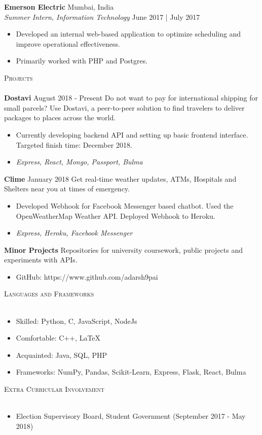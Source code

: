 \documentclass[a4paper]{article}
\newcommand{\lineunder} {
    \vspace*{-8pt} \\
    \hspace*{-18pt} \hrulefill \\
}
\newcommand{\header} [1] {
    {\hspace*{-18pt}\vspace*{6pt} \textsc{#1}}
    \vspace*{-6pt} \lineunder
}
\begin{document}
\textbf{Emerson Electric} \hfill Mumbai, India\\
\textit{Summer Intern, Information Technology} \hfill June 2017 | July 2017\\
\vspace{-1mm}
\begin{itemize} \itemsep 1pt
	\item Developed an internal web-based application to optimize scheduling and improve operational effectiveness.
	\item Primarily worked with PHP and Postgres.
\end{itemize}


\vspace{2mm}

\header{Projects}
{\textbf{Dostavi}} August 2018 - Present \hspace{1mm} Do not want to pay for international shipping for small parcels? Use Dostavi, a peer-to-peer solution to find travelers to deliver packages to places across the world. 
\begin{itemize}
\item Currently developing backend API and setting up basic frontend interface. Targeted finish time: December 2018.
\item \textit{Express, React, Mongo, Passport, Bulma} 
\end{itemize}
\vspace*{2mm}
{\textbf{Clime}} January 2018 \hspace{1mm} Get real-time weather updates, ATMs, Hospitals and Shelters near you at times of emergency.
\begin{itemize}
\item Developed Webhook for Facebook Messenger based chatbot. Used the OpenWeatherMap Weather API. Deployed Webhook to Heroku.
\item \textit{Express, Heroku, Facebook Messenger}
\end{itemize}
\textbf{Minor Projects} Repositories for university coursework, public projects and experiments with APIs. 
\begin{itemize}
\item GitHub: https://www.github.com/adarsh9pai
\end{itemize}
\vspace{2mm}

\header{Languages and Frameworks}
\begin{itemize}
\item Skilled: Python, C, JavaScript, NodeJs
\item Comfortable: C++, \LaTeX
\item Acquainted: Java, SQL, PHP
\item Frameworks: NumPy, Pandas, Scikit-Learn, Express, Flask, React, Bulma
\end{itemize}

\vspace{2mm}

\header{Extra Curricular Involvement}
\begin{itemize}
\item Election Supervisory Board, Student Government (September 2017 - May 2018)
\end{itemize}
\vspace{1mm}
\end{document}
